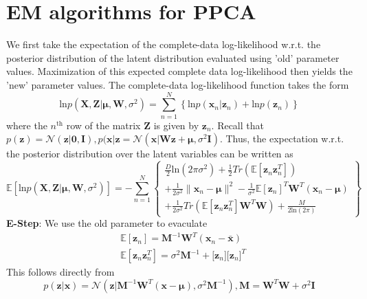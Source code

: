 \documentclass{article}
\begin{document}
	\section{EM algorithms for PPCA}
	We first take the expectation of the complete-data log-likelihood w.r.t. the posterior distribution of the latent distribution evaluated using 'old' parameter values. Maximization of this expected complete data log-likelihood then yields the 'new' parameter values. The complete-data log-likelihood function takes the form
	\begin{equation}
	\text{ln}p\left(\mathbf{X},\mathbf{Z}|\boldsymbol{\mu},\boldsymbol{W},\sigma^2\right)=\sum\limits_{n=1}^{N}
	\left\{\text{ln}p\left(\mathbf{x}_n|\mathbf{z}_n\right)+\text{ln}p\left(\mathbf{z}_n\right)\right\}	
	\end{equation}
	where the $n^{\text{th}}$ row of the matrix $\mathbf{Z}$ is given by $\mathbf{z}_n$. Recall that $p(\mathbf{z}) = \mathcal{N}(\mathbf{z}|\mathbf{0,I}),p(\mathbf{x|z}=\mathcal{N}(\mathbf{x}|\mathbf{Wz}+\boldsymbol{\mu},\sigma^2\mathbf{I})$. Thus, the expectation w.r.t. the posterior distribution over the latent variables can be written as
	\begin{equation}
	\mathds{E}\left[\text{ln}p\left(\mathbf{X},\mathbf{Z}|\boldsymbol{\mu},\mathbf{W},\sigma^2\right)\right] =
	 -\sum\limits_{n=1}^{N}
	\left\{\begin{array}{c}
	\frac{D}{2}\text{ln}\left(2\pi\sigma^2\right)+\frac{1}{2}Tr\left(\mathds{E}\left[\mathbf{z}_n\mathbf{z}_n^T\right]\right)\\
	+\frac{1}{2\sigma^2}\|\mathbf{x}_n-\boldsymbol{\mu}\|^2-\frac{1}{\sigma^2}\mathds{E}\left[\mathbf{z}_n\right]^T\mathbf{W}^T\left(\mathbf{x}_n-\boldsymbol{\mu}\right)\\
	+\frac{1}{2\sigma^2}Tr\left(\mathds{E}\left[\mathbf{z}_n\mathbf{z}_n^T\right]\mathbf{W}^T\mathbf{W}\right)+\frac{M}{2\text{ln}\left(2\pi\right)}
	\end{array}\right\}\label{eq:12}
	\end{equation}  
	{\bfseries E-Step}: We use the old parameter to evaculate
	\begin{align}
	&\mathds{E}[\mathbf{z}_n] = \mathbf{M}^{-1}\mathbf{W}^T(\mathbf{x}_n-\bar{\mathbf{x}})\\
	&\mathds{E}[\mathbf{z}_n\mathbf{z}_n^T] = \sigma^2\mathbf{M}^{-1} + \mathds[\mathbf{z}_n]\mathds[\mathbf{z}_n]^T
	\end{align}
	This follows directly from
	\begin{equation}
	p(\mathbf{z|x}) = \mathbf{\mathcal{N}}\left(\mathbf{z}|\mathbf{M}^{-1}\mathbf{W}^T\left(\mathbf{x}-\boldsymbol{\mu}\right),\sigma^2\mathbf{M}^{-1}\right),\mathbf{M} = \mathbf{W}^T\mathbf{W}+\sigma^2\mathbf{I}\label{eq:15}
	\end{equation}
\end{document}
